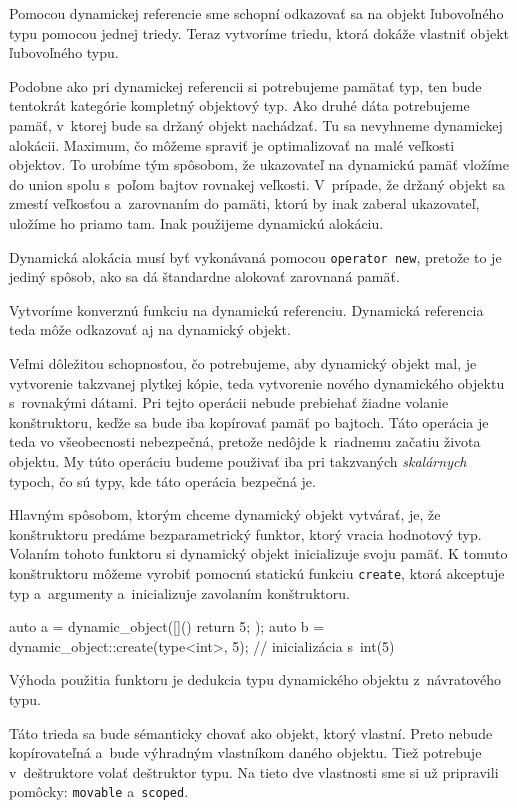 Pomocou dynamickej referencie sme schopní odkazovať sa na objekt ľubovoľného typu pomocou jednej triedy. Teraz vytvoríme triedu, ktorá dokáže vlastniť objekt ľubovoľného typu.

Podobne ako pri dynamickej referencii si potrebujeme pamätať typ, ten bude tentokrát kategórie kompletný objektový typ. Ako druhé dáta potrebujeme pamäť, v~ktorej bude sa držaný objekt nachádzať. Tu sa nevyhneme dynamickej alokácii. Maximum, čo môžeme spraviť je optimalizovať na malé veľkosti objektov. To urobíme tým spôsobom, že ukazovateľ na dynamickú pamäť vložíme do union spolu s~poľom bajtov rovnakej veľkosti. V~prípade, že držaný objekt sa zmestí veľkosťou a~zarovnaním do pamäti, ktorú by inak zaberal ukazovateľ, uložíme ho priamo tam. Inak použijeme dynamickú alokáciu.

Dynamická alokácia musí byť vykonávaná pomocou \texttt{operator new}, pretože to je jediný spôsob, ako sa dá štandardne alokovať zarovnaná pamäť.

Vytvoríme konverznú funkciu na dynamickú referenciu. Dynamická referencia teda môže odkazovať aj na dynamický objekt.

Veľmi dôležitou schopnosťou, čo potrebujeme, aby dynamický objekt mal, je vytvorenie takzvanej plytkej kópie, teda vytvorenie nového dynamického objektu s~rovnakými dátami. Pri tejto operácii nebude prebiehať žiadne volanie konštruktoru, keďže sa bude iba kopírovať pamäť po bajtoch. Táto operácia je teda vo všeobecnosti nebezpečná, pretože nedôjde k~riadnemu začatiu života objektu. My túto operáciu budeme použivať iba pri takzvaných \emph{skalárnych} typoch, čo sú typy, kde táto operácia bezpečná je.

Hlavným spôsobom, ktorým chceme dynamický objekt vytvárať, je, že konštruktoru predáme bezparametrický funktor, ktorý vracia hodnotový typ. Volaním tohoto funktoru si dynamický objekt inicializuje svoju pamäť. K tomuto konštruktoru môžeme vyrobiť pomocnú statickú funkciu \texttt{create}, ktorá akceptuje typ a~argumenty a~inicializuje zavolaním konštruktoru.
\begin{code}
auto a = dynamic_object([](){ return 5; });
auto b = dynamic_object::create(type<int>, 5);
// inicializácia s~int(5)
\end{code}
Výhoda použitia funktoru je dedukcia typu dynamického objektu z~návratového typu.

Táto trieda sa bude sémanticky chovať ako objekt, ktorý vlastní. Preto nebude kopírovateľná a~bude výhradným vlastníkom daného objektu. Tiež potrebuje v~deštruktore volať deštruktor typu. Na tieto dve vlastnosti sme si už pripravili pomôcky: \texttt{movable} a~\texttt{scoped}.

